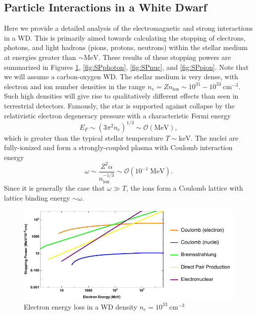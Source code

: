 \documentclass[twocolumn,preprintnumbers,amsmath,amssymb,prl, superscriptaddress]{revtex4}
\newcommand{\OO}{\mathcal{O}}
\newcommand{\MeV}{\text{MeV}}
\newcommand{\keV}{\text{keV}}
\newcommand{\cm}{\text{cm}}
\begin{document}
\begin{appendices}

\section{Particle Interactions in a White Dwarf}
\label{sec:Appendix}
Here we provide a detailed analysis of the electromagnetic and strong interactions in a WD.
This is primarily aimed towards calculating the stopping of electrons, photons, and light hadrons (pions, protons, neutrons) within the stellar medium at energies greater than $\sim \text{MeV}$.
These results of these stopping powers are summarized in Figures \ref{fig:SPelectron}, \ref{fig:SPphoton}, \ref{fig:SPnuc}, and \ref{fig:SPpion}.
Note that we will assume a carbon-oxygen WD.
The stellar medium is very dense, with electron and ion number densities in the range $n_e = Z n_\text{ion} \sim 10^{31} - 10^{33} ~\cm^{-3}$.
Such high densities will give rise to qualitatively different effects than seen in terrestrial detectors.
Famously, the star is supported against collapse by the relativistic electron degeneracy pressure with a characteristic Fermi energy
\begin{equation}
  E_F \sim (3 \pi^2 n_e)^{1/3} \sim \OO(\MeV),
\end{equation}
which is greater than the typical stellar temperature $T \sim \keV$.
The nuclei are fully-ionized and form a strongly-coupled plasma with Coulomb interaction energy
\begin{equation}
\label{eq:lattice}
  \omega \sim \frac{Z^2 \alpha}{n_\text{ion}^{-1/3}}
         \sim \OO(10^{-1} ~\MeV).
\end{equation}
Since it is generally the case that $\omega \gg T$, the ions form a Coulomb lattice with lattice binding energy $\sim \omega$.
\begin{figure}
\includegraphics[scale=.60]{SPelectron.pdf}
\caption{Electron energy loss in a WD density $n_e = 10^{33} ~\text{cm}^{-3}$}
\label{fig:SPelectron}
\end{figure}


\end{appendices}
\end{document}

